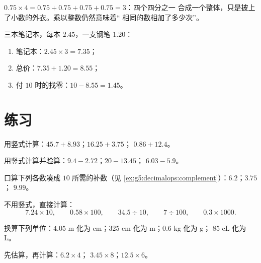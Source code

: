 \begin{example}[重复加法依然适用]\label{ex:g5:decimalops:mult}
$0.75 \times 4 = 0.75 + 0.75 + 0.75 + 0.75 = 3$：四个四分之一
合成一个整体，只是披上了小数的外衣。乘以整数仍然意味着“
相同的数相加了多少次”。
\end{example}

\begin{example}[购物]\label{ex:g5:decimalops:shopping}
三本笔记本，每本 $2.45$，一支钢笔 $1.20$：
\begin{enumerate}
  \item 笔记本：$2.45 \times 3 = 7.35$；
  \item 总价：$7.35 + 1.20 = 8.55$；
  \item 付 $10$ 时的找零：$10 - 8.55 = 1.45$。
\end{enumerate}
\end{example}

\section{练习}

\begin{exercise}[$\star$]\label{exo:g5:decimalops:1}
用竖式计算：$45.7 + 8.93$；\quad $16.25 + 3.75$；\quad
$0.86 + 12.4$。
\end{exercise}

\begin{exercise}[$\star$]\label{exo:g5:decimalops:2}
用竖式计算并验算：$9.4 - 2.72$；\quad $20 - 13.45$；
\quad $6.03 - 5.9$。
\end{exercise}

\begin{exercise}[$\star$]\label{exo:g5:decimalops:3}
口算下列各数凑成 $10$ 所需的补数（见
\cref{ex:g5:decimalops:complement}）：$6.2$；\quad $3.75$；\quad
$9.99$。
\end{exercise}

\begin{exercise}[$\star$]\label{exo:g5:decimalops:4}
不用竖式，直接计算：
\[
7.24 \times 10, \qquad
0.58 \times 100, \qquad
34.5 \div 10, \qquad
7 \div 100, \qquad
0.3 \times 1000 .
\]
\end{exercise}

\begin{exercise}[$\star$]\label{exo:g5:decimalops:5}
换算下列单位：$4.05$ m 化为 cm；\quad $325$ cm 化为 m；\quad $0.6$ kg 化为 g；
\quad $85$ cL 化为 L。
\end{exercise}

\begin{exercise}[$\star$]\label{exo:g5:decimalops:6}
先估算，再计算：$6.2 \times 4$；\quad
$3.45 \times 8$；\quad $12.5 \times 6$。
\end{exercise}

